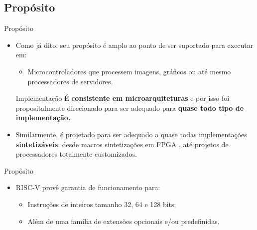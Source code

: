 \documentclass[red, aspectratio=169, xcolor=dvipsnames]{beamer}
\let\olditem=\item%
\renewcommand{\item}{\olditem \justifying}
\begin{document}
\subsection{Propósito}
\begin{frame}{Propósito}
	\begin{itemize}
		\setlength{\itemsep}{1.5em}
		\item Como já dito, seu propósito é amplo ao ponto de ser suportado para executar em:
		\begin{itemize}
			\item Microcontroladores que processem imagens, gráficos ou até mesmo processadores de servidores.
		\end{itemize}


		\begin{block}{Implementação}
			É \textbf{consistente em microarquiteturas} e por isso foi propositalmente direcionado para ser adequado para \textbf{quase todo tipo de implementação.}
		\end{block}
		\setlength{\itemsep}{1em}
			
		\item Similarmente, é projetado para ser adequado a quase todas implementações \textbf{sintetizáveis}, desde macros sintetizações em FPGA \Laughey, até projetos de processadores totalmente customizados.
		
	\end{itemize}
\end{frame}


\begin{frame}{Propósito}
	\begin{itemize}
		\setlength{\itemsep}{1.5em}
		\item RISC-V provê garantia de funcionamento  para:
		\begin{itemize}
			\item Instruções de inteiros tamanho 32, 64 e 128 bits;
			\item Além de uma família de extensões opcionais e/ou predefinidas.
		\end{itemize}

	\end{itemize}
\end{frame}
\end{document}
